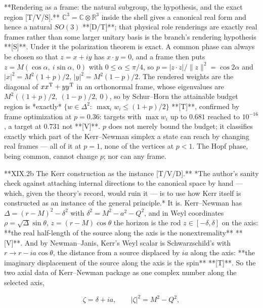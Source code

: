 **Rendering as a frame: the natural subgroup, the hypothesis, and the exact region [T/V/S].** $\mathbb C^3 = \mathbb C\otimes\mathbb R^3$ inside the shell gives a canonical real form and hence a natural $SO(3)$ **[D/T]**; that physical role renderings are exactly real frames rather than some larger unitary basis is the branch's rendering hypothesis **[S]**. Under it the polarization theorem is exact. A common phase can always be chosen so that $z = x+iy$ has $x\cdot y = 0$, and a frame then puts $z = M(\cos\alpha,\ i\sin\alpha,\ 0)$ with $0\leq\alpha\leq\pi/4$, so $p = |z\cdot z|/\|z\|^2 = \cos2\alpha$ and $|x|^2 = M^2(1+p)/2$, $|y|^2 = M^2(1-p)/2$. The rendered weights are the diagonal of $xx^{\rm T}+yy^{\rm T}$ in an orthonormal frame, whose eigenvalues are $M^2((1+p)/2,\ (1-p)/2,\ 0)$, so by Schur–Horn the attainable budget region is *exactly* $\{w\in\Delta^2:\ \max_iw_i\leq(1+p)/2\}$ **[T]**, confirmed by frame optimization at $p = 0.36$: targets with $\max w_i$ up to $0.681$ reached to $10^{-16}$, a target at $0.731$ not **[V]**. $p$ does not merely bound the budget; it classifies exactly which part of the Kerr–Newman simplex a state can reach by changing real frames — all of it at $p = 1$, none of the vertices at $p<1$. The Hopf phase, being common, cannot change $p$; nor can any frame.

**XIX.2b The Kerr construction as the instance [T/V/D].** *The author's sanity check against attaching internal directions to the canonical space by hand — which, given the theory's record, would ruin it — is to use how Kerr itself is constructed as an instance of the general principle.* It is. Kerr–Newman has $\Delta = (r-M)^2-\delta^2$ with $\delta^2 = M^2-a^2-Q^2$, and in Weyl coordinates $\rho = \sqrt\Delta\sin\theta$, $z = (r-M)\cos\theta$ the horizon is the rod $z\in[-\delta,\delta]$ on the axis: **the real half-length of the source along the axis is the nonextremality** **[V]**. And by Newman–Janis, Kerr's Weyl scalar is Schwarzschild's with $r\to r-ia\cos\theta$, the distance from a source displaced by $ia$ along the axis: **the imaginary displacement of the source along the axis is the spin** **[T]**. So the two axial data of Kerr–Newman package as one complex number along the selected axis,

$$\zeta = \delta+ia,\qquad |\zeta|^2 = M^2-Q^2,$$

